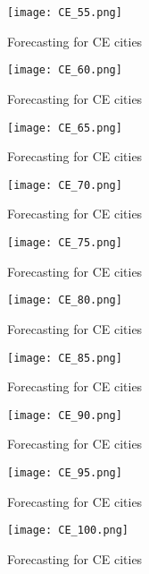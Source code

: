  \begin{figure}[!ht] 
 \centering 
 \texttt{[image: CE\_55.png]} 
 \caption{Forecasting for CE cities } 
 \label{fig:CE_55} 
 \end{figure} 
 
 \begin{figure}[!ht] 
 \centering 
 \texttt{[image: CE\_60.png]} 
 \caption{Forecasting for CE cities } 
 \label{fig:CE_60} 
 \end{figure} 
 
 \begin{figure}[!ht] 
 \centering 
 \texttt{[image: CE\_65.png]} 
 \caption{Forecasting for CE cities } 
 \label{fig:CE_65} 
 \end{figure} 
 
 \begin{figure}[!ht] 
 \centering 
 \texttt{[image: CE\_70.png]} 
 \caption{Forecasting for CE cities } 
 \label{fig:CE_70} 
 \end{figure} 
 
 \begin{figure}[!ht] 
 \centering 
 \texttt{[image: CE\_75.png]} 
 \caption{Forecasting for CE cities } 
 \label{fig:CE_75} 
 \end{figure} 
 
 \begin{figure}[!ht] 
 \centering 
 \texttt{[image: CE\_80.png]} 
 \caption{Forecasting for CE cities } 
 \label{fig:CE_80} 
 \end{figure} 
 
 \begin{figure}[!ht] 
 \centering 
 \texttt{[image: CE\_85.png]} 
 \caption{Forecasting for CE cities } 
 \label{fig:CE_85} 
 \end{figure} 
 
 \begin{figure}[!ht] 
 \centering 
 \texttt{[image: CE\_90.png]} 
 \caption{Forecasting for CE cities } 
 \label{fig:CE_90} 
 \end{figure} 
 
 \begin{figure}[!ht] 
 \centering 
 \texttt{[image: CE\_95.png]} 
 \caption{Forecasting for CE cities } 
 \label{fig:CE_95} 
 \end{figure} 
 
 \begin{figure}[!ht] 
 \centering 
 \texttt{[image: CE\_100.png]} 
 \caption{Forecasting for CE cities } 
 \label{fig:CE_100} 
 \end{figure} 
 
